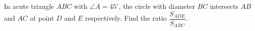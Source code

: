 In acute triangle $ABC$ with $\angle A=45^{\circ}$, the circle with diameter $BC$ intersects $AB$ and $AC$ at point $D$ and $E$ respectively. Find the ratio $\dfrac{S_{ADE}}{S_{ABC}}$.
